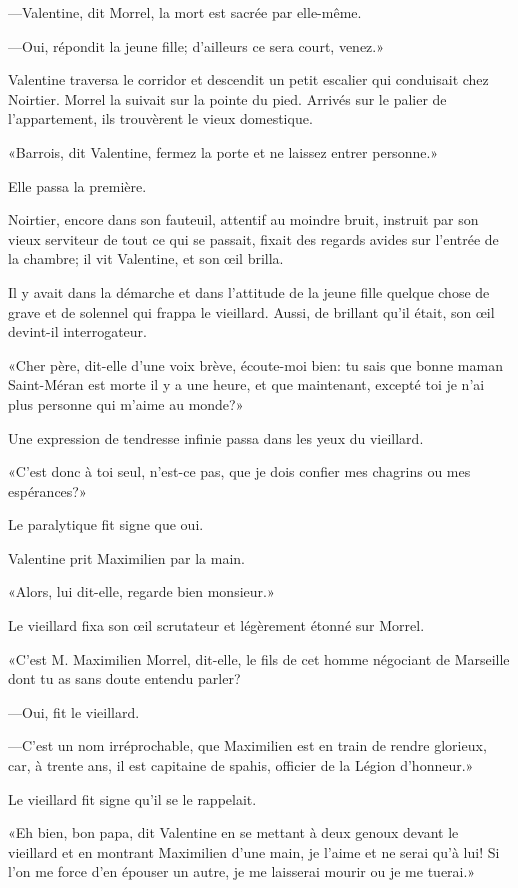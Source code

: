—Valentine, dit Morrel, la mort est sacrée par elle-même. 

—Oui, répondit la jeune fille; d'ailleurs ce sera court, venez.» 

Valentine traversa le corridor et descendit un petit escalier qui conduisait chez Noirtier. Morrel la suivait sur la pointe du pied. Arrivés sur le palier de l'appartement, ils trouvèrent le vieux domestique. 

«Barrois, dit Valentine, fermez la porte et ne laissez entrer personne.» 

Elle passa la première. 

Noirtier, encore dans son fauteuil, attentif au moindre bruit, instruit par son vieux serviteur de tout ce qui se passait, fixait des regards avides sur l'entrée de la chambre; il vit Valentine, et son œil brilla. 

Il y avait dans la démarche et dans l'attitude de la jeune fille quelque chose de grave et de solennel qui frappa le vieillard. Aussi, de brillant qu'il était, son œil devint-il interrogateur. 

«Cher père, dit-elle d'une voix brève, écoute-moi bien: tu sais que bonne maman Saint-Méran est morte il y a une heure, et que maintenant, excepté toi je n'ai plus personne qui m'aime au monde?» 

Une expression de tendresse infinie passa dans les yeux du vieillard. 

«C'est donc à toi seul, n'est-ce pas, que je dois confier mes chagrins ou mes espérances?» 

Le paralytique fit signe que oui. 

Valentine prit Maximilien par la main. 

«Alors, lui dit-elle, regarde bien monsieur.» 

Le vieillard fixa son œil scrutateur et légèrement étonné sur Morrel. 

«C'est M. Maximilien Morrel, dit-elle, le fils de cet homme négociant de Marseille dont tu as sans doute entendu parler? 

—Oui, fit le vieillard. 

—C'est un nom irréprochable, que Maximilien est en train de rendre glorieux, car, à trente ans, il est capitaine de spahis, officier de la Légion d'honneur.» 

Le vieillard fit signe qu'il se le rappelait. 

«Eh bien, bon papa, dit Valentine en se mettant à deux genoux devant le vieillard et en montrant Maximilien d'une main, je l'aime et ne serai qu'à lui! Si l'on me force d'en épouser un autre, je me laisserai mourir ou je me tuerai.» 

